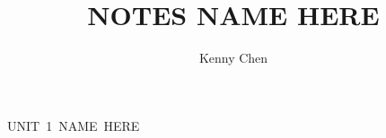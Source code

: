 \documentclass[12pt]{report}
\title{NOTES NAME HERE} %
\author{Kenny Chen}
\begin{document}
    \maketitle 
    \tableofcontents 
    \newpage

    \unit{UNIT 1 NAME HERE} %
    
    \newpage
\end{document}

